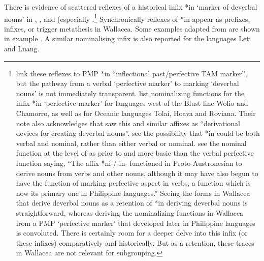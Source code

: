 There is evidence of scattered reflexes of a historical infix
*\<in\> ‘marker of deverbal nouns’ in ,
, and  (especially .\footnote{
		\citet[575]{SchapperZobel2024a} link these reflexes to PMP *\<in\> “inflectional
		past/perfective TAM marker”, but the pathway from a verbal ‘perfective marker’ to marking
		‘deverbal nouns’ is not immediately transparent.
		\citet{BlustTrussel2020} list nominalizing functions for the
		 infix *\<in\> ‘perfective marker’ for languages west of the Blust line
		Wolio and Chamorro, as well as for Oceanic languages Tolai, Hoava and Roviana.
		Their note also acknowledges that \citet{StarostaPawleyReid1982} saw this
		and similar affixes as “derivational devices for creating deverbal nouns”.
		\citet{BlustTrussel2020} see the possibility that  *\<in\> could be both
		verbal and nominal, rather than either verbal or nominal.
		\citet[163]{StarostaPawleyReid1982} see the nominal function
		at the level of  as prior to
		and more basic than the verbal perfective function saying,
		“The affix *ni-/-in- functioned in Proto-Austronesian to derive
		nouns from verbs and other nouns, although it may have also begun to have the
		function of marking perfective aspect in verbs,
		a function which is now its primary one in Philippine languages.”
		Seeing the forms in Wallacea that derive deverbal nouns as a
		retention of  *\<in\> deriving deverbal nouns is straightforward,
		whereas deriving the nominalizing functions in Wallacea from
		a PMP ‘perfective marker’ that developed later in Philippine languages is convoluted.
		There is certainly room for a deeper delve into this infix (or
		these infixes) comparatively and historically.
		But as a retention,
		these traces in Wallacea are not relevant for subgrouping.}
Synchronically reflexes of *\<in\> appear as prefixes,
infixes, or trigger metathesis in Wallacea.
Some examples adapted from \citet[575f]{SchapperZobel2024a} are
shown in example .
A similar nominalising infix is also reported for the 
languages Leti and Luang.
\\

